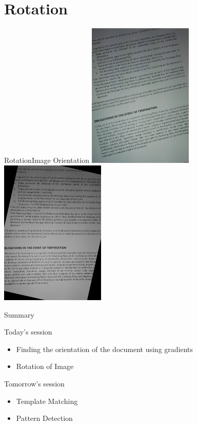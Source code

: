 \documentclass{beamer}
\begin{document}
\section{Rotation}
\begin{frame}{Rotation}{Image Orientation}
\centering
    \includegraphics[width=50mm]{./Image1.jpg}\includegraphics[width=50mm]{./dst.png}

\end{frame}

\begin{frame}{Summary}
\begin{block}{Today's session}
\begin{itemize}
    \item Finding the orientation of the document using gradients
    \item Rotation of Image
\end{itemize}
\end{block}

\begin{block}{Tomorrow's session}
\begin{itemize}
    \item Template Matching
    \item Pattern Detection
\end{itemize}
\end{block}

\end{frame}
\end{document}
